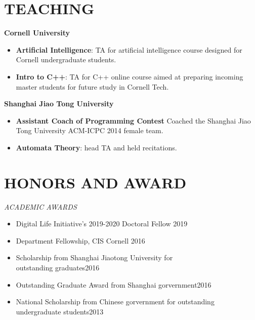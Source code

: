 \documentclass[margin, 10pt]{res} %
\begin{document}
\begin{resume}

\section{TEACHING}
\textbf{Cornell University}
\begin{itemize}
\item \textbf{Artificial Intelligence}: TA for artificial intelligence course designed for Cornell undergraduate students.
\item \textbf{Intro to C++}: TA for C++ online course aimed at preparing incoming master students for future study in Cornell Tech. 
\end{itemize}

\textbf{Shanghai Jiao Tong University}
\begin{itemize}
\item \textbf{Assistant Coach of Programming Contest} Coached the Shanghai Jiao Tong University ACM-ICPC 2014 female team.
\item \textbf{Automata Theory}: head TA and held recitations.
\end{itemize}




\section{HONORS AND AWARD}

{\sl ACADEMIC AWARDS}\\
\begin{itemize}
\item Digital Life Initiative's 2019-2020 Doctoral Fellow \hfill 2019
\item Department Fellowship, CIS Cornell \hfill 2016
\item Scholarship from Shanghai Jiaotong University for\\ outstanding graduates\hfill 2016
\item Outstanding Graduate Award from Shanghai gorvernment\hfill 2016
\item National Scholarship from Chinese gorvernment for outstanding\\ undergraduate students\hfill 2013 
\end{itemize}




\end{resume}
\end{document}
